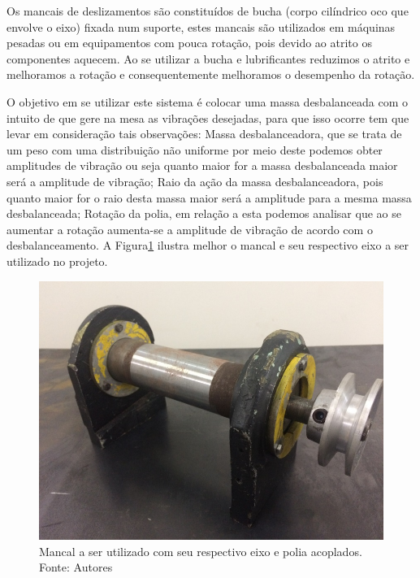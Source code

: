     Os mancais de deslizamentos são constituídos de bucha (corpo cilíndrico oco que envolve o eixo) fixada num suporte, estes mancais são utilizados em máquinas pesadas ou em equipamentos com pouca rotação, pois devido ao atrito os componentes aquecem. Ao se utilizar a bucha e lubrificantes reduzimos o atrito e melhoramos a rotação e consequentemente melhoramos o desempenho da rotação.

    O objetivo em se utilizar este sistema é colocar uma massa desbalanceada com o intuito de que gere na mesa as vibrações desejadas, para que isso ocorre tem que levar em consideração tais observações: Massa desbalanceadora, que se trata de um peso com uma distribuição não uniforme por meio deste podemos obter amplitudes de vibração ou seja quanto maior for a massa desbalanceada maior será a amplitude de vibração; Raio da ação da massa desbalanceadora, pois quanto maior for o raio desta massa maior será a amplitude para a mesma massa desbalanceada; Rotação da polia, em relação a esta podemos analisar que ao se aumentar a rotação aumenta-se a amplitude de vibração de acordo com o desbalanceamento. A Figura\ref{fig:mancal} ilustra melhor o mancal e seu respectivo eixo a ser utilizado no projeto.

\begin{figure}[H]
\centering
\includegraphics[scale=0.9]{figuras/mancal.jpg}
\caption{Mancal a ser utilizado com seu respectivo eixo e polia acoplados. Fonte: Autores}
\label{fig:mancal}
\end{figure}


